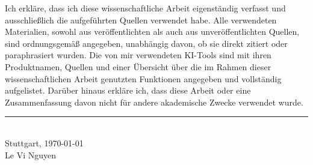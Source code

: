 
Ich erkläre, dass ich diese wissenschaftliche Arbeit eigenständig verfasst und ausschließlich die aufgeführten Quellen verwendet habe. Alle verwendeten Materialien, sowohl aus veröffentlichten als auch aus unveröffentlichten Quellen, sind ordnungsgemäß angegeben, unabhängig davon, ob sie direkt zitiert oder paraphrasiert wurden. 
\newline
Die von mir verwendeten KI-Tools sind mit ihren Produktnamen, Quellen und einer Übersicht über die im Rahmen dieser wissenschaftlichen Arbeit genutzten Funktionen angegeben und vollständig aufgelistet.
Darüber hinaus erkläre ich, dass diese Arbeit oder eine Zusammenfassung davon nicht für andere akademische Zwecke verwendet wurde.

\vspace{2cm}

\noindent\rule{6cm}{0.4pt} \\
Stuttgart, \today \\
Le Vi Nguyen 
